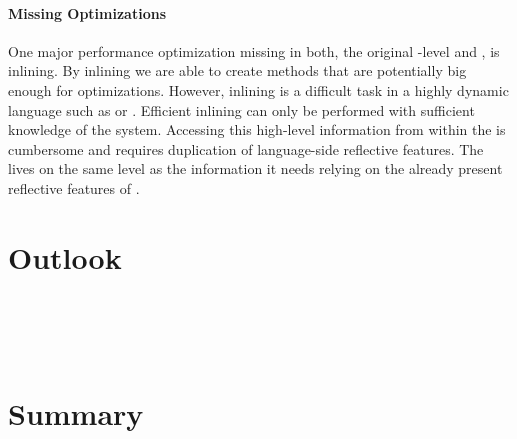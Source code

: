 \paragraph{Missing Optimizations}
One major performance optimization missing in both, the original \PH \VM-level \JIT and \NBJ, is inlining. 
By inlining we are able to create methods that are potentially big enough for optimizations.
However, inlining is a difficult task in a highly dynamic language such as \ST or \Self \cite{Cham89a}. 
Efficient inlining can only be performed with sufficient knowledge of the system. 
Accessing this high-level information from within the \VM is cumbersome and requires duplication of language-side reflective features.
The \JIT lives on the same level as the information it needs relying on the already present reflective features of \ST.


\section{Outlook}

 \\
 \\
 \\


\section{Summary}



